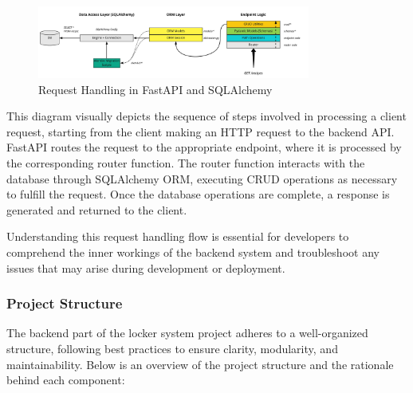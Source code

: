 \begin{figure}[h]
    \centering
    \includegraphics[width=0.8\textwidth]{images/request_handling_diagram}
    \caption{Request Handling in FastAPI and SQLAlchemy \citet{samiullah_fastapi_tutorial}}
    \label{fig:request_handling}
\end{figure}


This diagram visually depicts the sequence of steps involved in processing a client request, starting from the client making an HTTP request to the backend API. FastAPI routes the request to the appropriate endpoint, where it is processed by the corresponding router function. The router function interacts with the database through SQLAlchemy ORM, executing CRUD operations as necessary to fulfill the request. Once the database operations are complete, a response is generated and returned to the client.

Understanding this request handling flow is essential for developers to comprehend the inner workings of the backend system and troubleshoot any issues that may arise during development or deployment.


\subsubsection{Project Structure}

The backend part of the locker system project adheres to a well-organized structure, following best practices to ensure clarity, modularity, and maintainability. Below is an overview of the project structure and the rationale behind each component:

